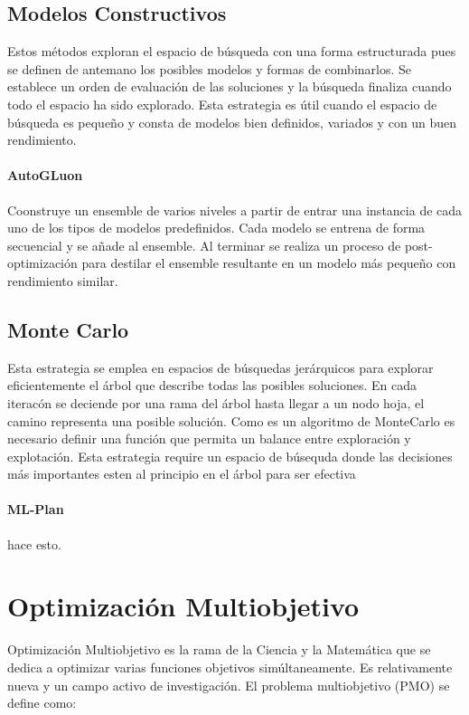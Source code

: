 \subsection{Modelos Constructivos}
     Estos m\'etodos exploran el espacio de b\'usqueda con una forma estructurada pues se definen de antemano los posibles modelos y formas de combinarlos. Se establece un orden de evaluaci\'on de las soluciones y la b\'usqueda finaliza cuando todo el espacio ha sido explorado. Esta estrategia es \'util cuando el espacio de b\'usqueda es peque\~no y consta de modelos bien definidos, variados y con un buen rendimiento.

     \paragraph{AutoGLuon} Coonstruye un ensemble de varios niveles a partir de entrar una instancia de cada uno de los tipos de modelos predefinidos. Cada modelo se entrena de forma secuencial y se a\~nade al ensemble. Al terminar se realiza un proceso de post-optimizaci\'on para destilar el ensemble resultante en un modelo m\'as peque\~no con rendimiento similar.

\subsection{Monte Carlo}
 Esta estrategia se emplea en espacios de b\'usquedas jer\'arquicos para explorar eficientemente el \'arbol que describe todas las  posibles soluciones. En cada iterac\'on se deciende por una rama del \'arbol hasta llegar a un nodo hoja, el camino representa una posible soluci\'on. Como es un algoritmo de MonteCarlo es necesario definir una funci\'on que permita un balance entre exploraci\'on y explotaci\'on. Esta estrategia require un espacio de b\'usequda donde las decisiones m\'as importantes esten al principio en el \'arbol para ser efectiva

 \paragraph{ML-Plan} hace esto.
    


\section{Optimizaci\'on Multiobjetivo}\label{proposal:moo}
Optimizaci\'on Multiobjetivo es la rama de la Ciencia y la Matem\'atica que se dedica a optimizar varias funciones objetivos sim\'ultaneamente. Es relativamente nueva y un campo activo de investigaci\'on. El problema multiobjetivo (PMO) se define como:
 
